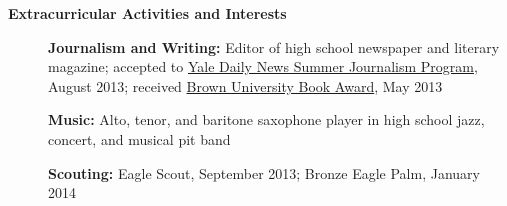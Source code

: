 \documentclass[letterpaper,10.6pt]{article}
\newcommand{\resheading}[1]{{\large \colorbox{mygrey}{\begin{minipage}{\textwidth}{\textbf{#1 \vphantom{p\^{E}}}}\end{minipage}}}}
\begin{document}
\resheading{Extracurricular Activities and Interests}
	\begin{description}
		\item[] \hspace{0.03in} \textbf{Journalism and Writing:} { \footnotesize Editor of high school newspaper and literary magazine; accepted to \href{http://yaledailynews.com/about-us/sjp/}{Yale Daily News Summer Journalism Program}, August 2013; received \href{http://www.brown.edu/campus-life/support/bookstore/book-award}{Brown University Book Award}, May 2013}
		\item[] \hspace{0.03in} \textbf{Music:} {\footnotesize Alto, tenor, and baritone saxophone player in high school jazz, concert, and musical pit band}
		\item[] \hspace{0.03in} \textbf{Scouting:} {\footnotesize Eagle Scout, September 2013; Bronze Eagle Palm, January 2014}
	\end{description}
\end{document}
